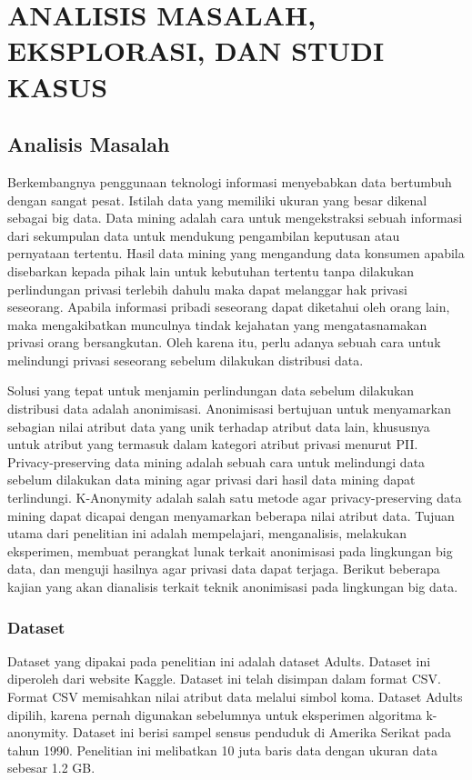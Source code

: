 \chapter{ANALISIS MASALAH, EKSPLORASI, DAN STUDI KASUS}
\section{Analisis Masalah}
Berkembangnya penggunaan teknologi informasi menyebabkan data bertumbuh dengan sangat pesat. Istilah data yang memiliki ukuran yang besar dikenal sebagai big data. Data mining adalah cara untuk mengekstraksi sebuah informasi dari sekumpulan data untuk mendukung pengambilan keputusan atau pernyataan tertentu. Hasil data mining yang mengandung data konsumen apabila disebarkan kepada pihak lain untuk kebutuhan tertentu tanpa dilakukan perlindungan privasi terlebih dahulu maka dapat melanggar hak privasi seseorang. Apabila informasi pribadi seseorang dapat diketahui oleh orang lain, maka mengakibatkan munculnya tindak kejahatan yang mengatasnamakan privasi orang bersangkutan. Oleh karena itu, perlu adanya sebuah cara untuk melindungi privasi seseorang sebelum dilakukan distribusi data.

\par Solusi yang tepat untuk menjamin perlindungan data sebelum dilakukan distribusi data adalah anonimisasi. Anonimisasi bertujuan untuk menyamarkan sebagian nilai atribut data yang unik terhadap atribut data lain, khususnya untuk atribut yang termasuk dalam kategori atribut privasi menurut PII. Privacy-preserving data mining adalah sebuah cara untuk melindungi data sebelum dilakukan data mining agar privasi dari hasil data mining dapat terlindungi. K-Anonymity adalah salah satu metode agar privacy-preserving data mining dapat dicapai dengan menyamarkan beberapa nilai atribut data. Tujuan utama dari penelitian ini adalah mempelajari, menganalisis, melakukan eksperimen, membuat perangkat lunak terkait anonimisasi pada lingkungan big data, dan menguji hasilnya agar privasi data dapat terjaga. Berikut beberapa kajian yang akan dianalisis terkait teknik anonimisasi pada lingkungan big data.

\subsection{Dataset}
Dataset yang dipakai pada penelitian ini adalah dataset Adults. Dataset ini diperoleh dari website Kaggle. Dataset ini telah disimpan dalam format CSV. Format CSV memisahkan nilai atribut data melalui simbol koma. Dataset Adults dipilih, karena pernah digunakan sebelumnya untuk eksperimen algoritma k-anonymity.  Dataset ini berisi sampel sensus penduduk di Amerika Serikat pada tahun 1990. Penelitian ini melibatkan 10 juta baris data dengan ukuran data sebesar 1.2 GB. 

